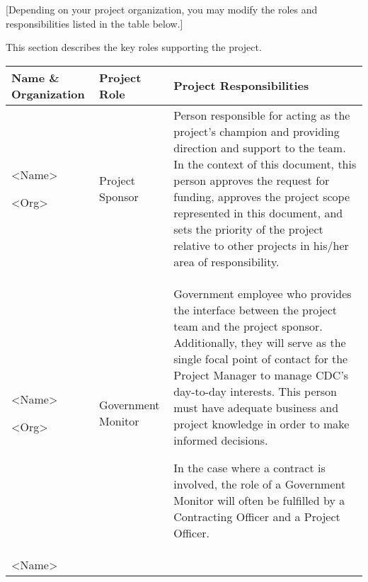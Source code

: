 \documentclass[a4paper, 11pt]{article}
\begin{document}
{[}Depending on your project organization, you may modify the roles and
responsibilities listed in the table below.{]}

This section describes the key roles supporting the project.

\begin{longtable}[]{@{}lll@{}}
\toprule
\textbf{Name \& Organization} & \textbf{Project Role} & \textbf{Project
Responsibilities}\tabularnewline
\midrule
\endhead
\begin{minipage}[t]{0.30\columnwidth}\raggedright
\textless{}Name\textgreater{}

\textless{}Org\textgreater{}\strut
\end{minipage} & \begin{minipage}[t]{0.30\columnwidth}\raggedright
Project Sponsor\strut
\end{minipage} & \begin{minipage}[t]{0.30\columnwidth}\raggedright
Person responsible for acting as the project's champion and providing
direction and support to the team. In the context of this document, this
person approves the request for funding, approves the project scope
represented in this document, and sets the priority of the project
relative to other projects in his/her area of responsibility.\strut
\end{minipage}\tabularnewline
\begin{minipage}[t]{0.30\columnwidth}\raggedright
\textless{}Name\textgreater{}

\textless{}Org\textgreater{}\strut
\end{minipage} & \begin{minipage}[t]{0.30\columnwidth}\raggedright
Government Monitor\strut
\end{minipage} & \begin{minipage}[t]{0.30\columnwidth}\raggedright
Government employee who provides the interface between the project team
and the project sponsor. Additionally, they will serve as the single
focal point of contact for the Project Manager to manage CDC's
day-to-day interests. This person must have adequate business and
project knowledge in order to make informed decisions.

In the case where a contract is involved, the role of a Government
Monitor will often be fulfilled by a Contracting Officer and a Project
Officer.\strut
\end{minipage}\tabularnewline
\begin{minipage}[t]{0.30\columnwidth}\raggedright
\textless{}Name\textgreater{}


\end{minipage}
\end{longtable}
\end{document}
